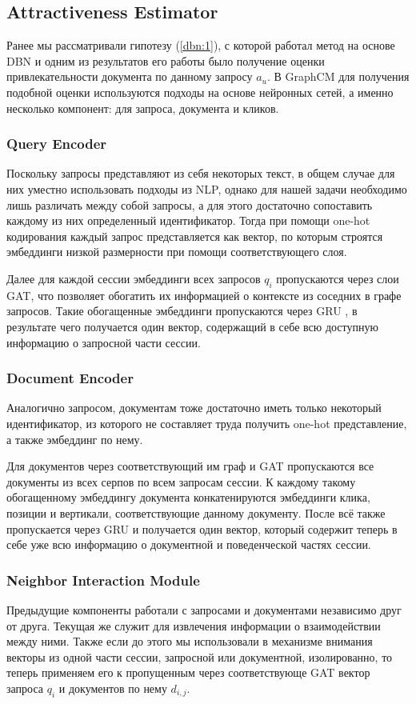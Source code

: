 \documentclass[diploma]{nanolab2015}
\begin{document}
\subsection{Attractiveness Estimator}
Ранее мы рассматривали гипотезу (\ref{dbn:1}), с которой работал метод на основе DBN и одним из результатов его работы было получение оценки привлекательности документа по данному запросу $a_u$. В GraphCM для получения подобной оценки используются подходы на основе нейронных сетей, а именно несколько компонент: для запроса, документа и кликов.

\subsubsection{Query Encoder}
Поскольку запросы представляют из себя некоторых текст, в общем случае для них уместно использовать подходы из NLP, однако для нашей задачи необходимо лишь различать между собой запросы, а для этого достаточно сопоставить каждому из них определенный идентификатор. Тогда при помощи one-hot кодирования каждый запрос представляется как вектор, по которым строятся эмбеддинги низкой размерности при помощи соответствующего слоя.

Далее для каждой сессии эмбеддинги всех запросов $q_i$ пропускаются через слои GAT, что позволяет обогатить их информацией о контексте из соседних в графе запросов. Такие обогащенные эмбеддинги пропускаются через GRU \cite{GRU}, в результате чего получается один вектор, содержащий в себе всю доступную информацию о запросной части сессии.

\subsubsection{Document Encoder}
Аналогично запросом, документам тоже достаточно иметь только некоторый идентификатор, из которого не составляет труда получить one-hot представление, а также эмбеддинг по нему.

Для документов через соответствующий им граф и GAT пропускаются все документы из всех серпов по всем запросам сессии. К каждому такому обогащенному эмбеддингу документа конкатенируются эмбеддинги клика, позиции и вертикали, соответствующие данному документу. После всё также пропускается через GRU и получается один вектор, который содержит теперь в себе уже всю информацию о документной и поведенческой частях сессии.

\subsubsection{Neighbor Interaction Module}
Предыдущие компоненты работали с запросами и документами независимо друг от друга. Текущая же служит для извлечения информации о взаимодействии между ними. Также если до этого мы использовали в механизме внимания векторы из одной части сессии, запросной или документной, изолированно, то теперь применяем его к пропущенным через соответствующе GAT вектор запроса $q_i$ и документов по нему $d_{i,j}$.
\end{document}
